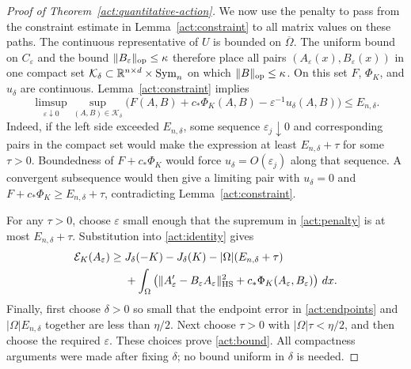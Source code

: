 \begin{proof}[Proof of Theorem~\ref{act:quantitative-action}]
We now use the penalty to pass from the constraint estimate in
Lemma~\ref{act:constraint} to all matrix values on these paths.
The continuous representative of $U$ is bounded on
$\overline\Omega$.  The uniform bound on $C_\varepsilon$ and the
bound $\|B_\varepsilon\|_{\operatorname{op}}\leq\kappa$ therefore place all pairs
$(A_\varepsilon(x),B_\varepsilon(x))$ in one compact set
$\mathcal K_\delta\subset\mathbb R^{n\times d}\times\operatorname{Sym}_n$ on which
$\|B\|_{\operatorname{op}}\leq\kappa$.  On this set $F$, $\Phi_K$, and
$u_\delta$ are continuous.  Lemma~\ref{act:constraint} implies
\begin{equation}\label{act:penalty}
 \limsup_{\varepsilon\downarrow0}
 \sup_{(A,B)\in\mathcal K_\delta}
    \bigl(F(A,B)+c_*\Phi_K(A,B)-\varepsilon^{-1}u_\delta(A,B)\bigr)
       \leq E_{n,\delta}.
\end{equation}
Indeed, if the left side exceeded $E_{n,\delta}$, some sequence
$\varepsilon_j\downarrow0$ and corresponding pairs in the compact
set would make the expression at least $E_{n,\delta}+\tau$ for
some $\tau>0$.  Boundedness of $F+c_*\Phi_K$ would force
$u_\delta=O(\varepsilon_j)$ along that sequence.  A convergent
subsequence would then give a limiting pair with $u_\delta=0$ and
$F+c_*\Phi_K\geq E_{n,\delta}+\tau$, contradicting
Lemma~\ref{act:constraint}.

For any $\tau>0$, choose $\varepsilon$ small enough that the
supremum in \eqref{act:penalty} is at most $E_{n,\delta}+\tau$.
Substitution into \eqref{act:identity} gives
\begin{align*}
 \mathcal E_K(A_\varepsilon)
 \geq{}&J_\delta(-K)-J_\delta(K)
        -|\Omega|(E_{n,\delta}+\tau)\\
 &+\int_\Omega\left(\|A_\varepsilon'-B_\varepsilon A_\varepsilon\|_{\mathrm{HS}}^2
                +c_*\Phi_K(A_\varepsilon,B_\varepsilon)\right)\,dx.
\end{align*}
Finally, first choose $\delta>0$ so small that the endpoint error
in \eqref{act:endpoints} and $|\Omega|E_{n,\delta}$ together are
less than $\eta/2$.  Next choose $\tau>0$ with
$|\Omega|\tau<\eta/2$, and then choose the required $\varepsilon$.
These choices prove \eqref{act:bound}.  All compactness arguments
were made after fixing $\delta$; no bound uniform in $\delta$ is
needed.
\end{proof}
